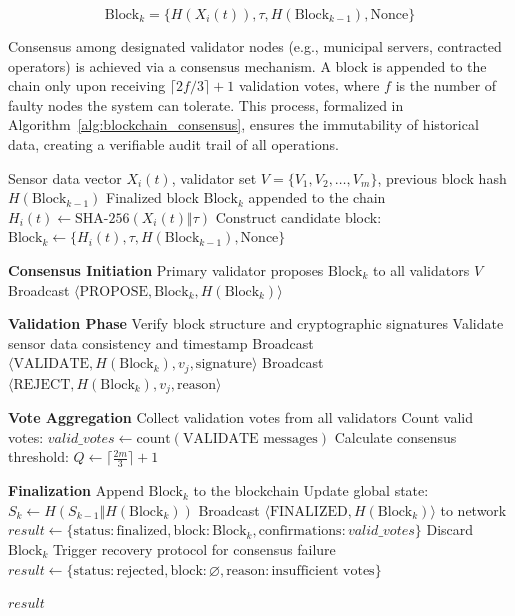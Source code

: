 \documentclass[final,5p,times,twocolumn]{elsarticle}
\begin{document}
\begin{equation}
\text{Block}_k = \{ H(X_i(t)), \tau, H(\text{Block}_{k-1}), \text{Nonce} \}
\label{block_struct}
\end{equation}

\noindent Consensus among designated validator nodes (e.g., municipal servers, contracted operators) is achieved via a consensus mechanism. A block is appended to the chain only upon receiving \( \lceil 2f/3 \rceil + 1 \) validation votes, where \( f \) is the number of faulty nodes the system can tolerate. This process, formalized in Algorithm~\ref{alg:blockchain_consensus}, ensures the immutability of historical data, creating a verifiable audit trail of all operations.

\begin{algorithm}[ht]
\caption{Blockchain Data Integrity And Consensus}
\label{alg:blockchain_consensus}
\begin{algorithmic}[1]
\REQUIRE Sensor data vector \(X_i(t)\), validator set \(V = \{V_1, V_2, \dots, V_m\}\), previous block hash \(H(\text{Block}_{k-1})\)
\ENSURE Finalized block \(\text{Block}_k\) appended to the chain
\STATE \(H_i(t) \leftarrow \text{SHA-256}(X_i(t) \Vert \tau)\) 
\STATE Construct candidate block: \(\text{Block}_k \leftarrow \{H_i(t), \tau, H(\text{Block}_{k-1}), \text{Nonce}\}\)

\STATE \textbf{Consensus Initiation}
\STATE Primary validator proposes \(\text{Block}_k\) to all validators \(V\)
\STATE Broadcast \(\langle \text{PROPOSE}, \text{Block}_k, H(\text{Block}_k) \rangle\)

\STATE \textbf{Validation Phase}
    \STATE Verify block structure and cryptographic signatures
    \STATE Validate sensor data consistency and timestamp
        \STATE Broadcast \(\langle \text{VALIDATE}, H(\text{Block}_k), v_j, \text{signature} \rangle\)
    \ELSE
        \STATE Broadcast \(\langle \text{REJECT}, H(\text{Block}_k), v_j, \text{reason} \rangle\)
    \ENDIF
\ENDFOR

\STATE \textbf{Vote Aggregation}
\STATE Collect validation votes from all validators
\STATE Count valid votes: \(valid\_votes \leftarrow \text{count}(\text{VALIDATE messages})\)
\STATE Calculate consensus threshold: \(Q \leftarrow \lceil \frac{2m}{3} \rceil + 1\)

\STATE \textbf{Finalization}
    \STATE Append \(\text{Block}_k\) to the blockchain
    \STATE Update global state: \(S_k \leftarrow H(S_{k-1} \Vert H(\text{Block}_k))\)
    \STATE Broadcast \(\langle \text{FINALIZED}, H(\text{Block}_k) \rangle\) to network
    \STATE \(result \leftarrow \{\text{status}:\text{finalized}, \text{block}:\text{Block}_k, \text{confirmations}:valid\_votes\}\)
\ELSE
    \STATE Discard \(\text{Block}_k\)
    \STATE Trigger recovery protocol for consensus failure
    \STATE \(result \leftarrow \{\text{status}:\text{rejected}, \text{block}:\varnothing, \text{reason}:\text{insufficient votes}\}\)
\ENDIF

\RETURN \(result\)
\end{algorithmic}
\end{algorithm}
\end{document}
